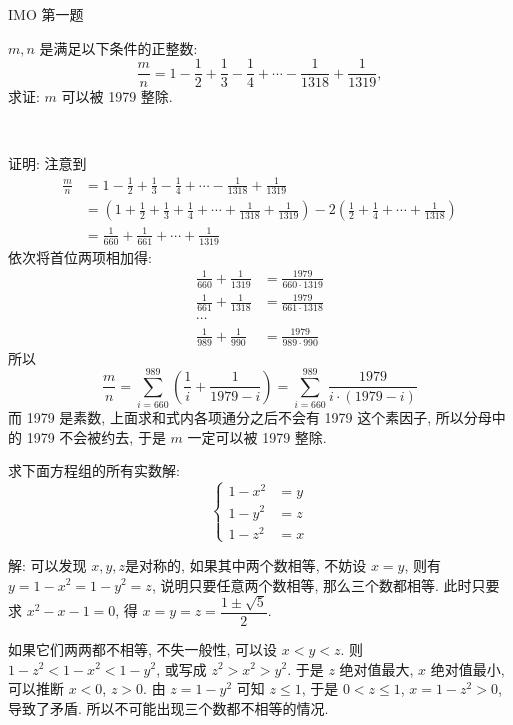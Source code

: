 \newpage
 IMO 第一题

$m,n$ 是满足以下条件的正整数:
\[\frac{m}{n} = 1 - \frac{1}{2} + \frac{1}{3} - \frac{1}{4} + \cdots -\frac{1}{1318} + \frac{1}{1319}, \]
求证: $m$ 可以被 1979 整除.

~

证明: 注意到
\begin{align*}
\frac{m}{n} &= 1 - \frac{1}{2} + \frac{1}{3} - \frac{1}{4} + \cdots -\frac{1}{1318} + \frac{1}{1319} \\
&= \left(1 + \frac{1}{2} + \frac{1}{3} + \frac{1}{4} + \cdots + \frac{1}{1318} + \frac{1}{1319}\right) - 2\left(\frac{1}{2}+\frac{1}{4}+\cdots+\frac{1}{1318}\right)\\
&= \frac{1}{660} + \frac{1}{661} + \cdots + \frac{1}{1319}
\end{align*}
依次将首位两项相加得:
\begin{align*}
\frac{1}{660} + \frac{1}{1319} &= \frac{1979}{660\cdot 1319}\\
\frac{1}{661} + \frac{1}{1318} &= \frac{1979}{661\cdot 1318}\\
\cdots & \\
\frac{1}{989} + \frac{1}{990} &= \frac{1979}{989\cdot 990}
\end{align*}
所以 
\[\frac{m}{n} = \sum_{i=660}^{989}{\left(\frac{1}{i} + \frac{1}{1979-i}\right)} = \sum_{i=660}^{989}\frac{1979}{i\cdot(1979-i)}\]
而 1979 是素数, 上面求和式内各项通分之后不会有 1979 这个素因子, 所以分母中的 1979 不会被约去, 于是 $m$ 一定可以被 1979 整除.

\newpage
求下面方程组的所有实数解:
\[
\begin{cases}
1 - x^2 & = y \\
1 - y^2 & = z \\
1 - z^2 & = x 
\end{cases}
\]

解: 可以发现 $x,y,z $是对称的, 如果其中两个数相等, 不妨设 $ x=y $, 则有 $ y = 1 - x^2 = 1 - y^2 = z $, 说明只要任意两个数相等, 那么三个数都相等. 此时只要求 $ x^2 - x - 1 = 0 $, 得 $ x = y = z = \dfrac{1\pm \sqrt{5}}{2} $.

如果它们两两都不相等, 不失一般性, 可以设 $ x < y < z $. 则 $ 1-z^2 < 1-x^2 < 1-y^2 $, 或写成 $ z^2 > x^2 > y^2 $. 于是 $z$ 绝对值最大, $x$ 绝对值最小, 可以推断 $ x < 0 $, $ z > 0 $. 由 $ z = 1 - y^2 $ 可知 $ z \le 1 $, 于是 $ 0 < z \le 1 $, $ x = 1 - z^2 > 0 $, 导致了矛盾. 所以不可能出现三个数都不相等的情况.

